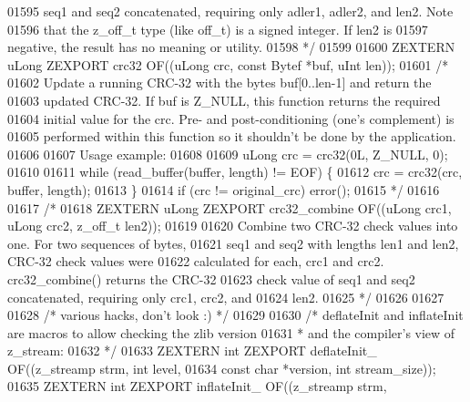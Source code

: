 \begin{DoxyCode}
01595 \textcolor{comment}{   seq1 and seq2 concatenated, requiring only adler1, adler2, and len2.  Note}
01596 \textcolor{comment}{   that the z\_off\_t type (like off\_t) is a signed integer.  If len2 is}
01597 \textcolor{comment}{   negative, the result has no meaning or utility.}
01598 \textcolor{comment}{*/}
01599 
01600 ZEXTERN uLong ZEXPORT crc32   OF((uLong crc, \textcolor{keyword}{const} Bytef *buf, uInt len));
01601 \textcolor{comment}{/*}
01602 \textcolor{comment}{     Update a running CRC-32 with the bytes buf[0..len-1] and return the}
01603 \textcolor{comment}{   updated CRC-32.  If buf is Z\_NULL, this function returns the required}
01604 \textcolor{comment}{   initial value for the crc.  Pre- and post-conditioning (one's complement) is}
01605 \textcolor{comment}{   performed within this function so it shouldn't be done by the application.}
01606 \textcolor{comment}{}
01607 \textcolor{comment}{   Usage example:}
01608 \textcolor{comment}{}
01609 \textcolor{comment}{     uLong crc = crc32(0L, Z\_NULL, 0);}
01610 \textcolor{comment}{}
01611 \textcolor{comment}{     while (read\_buffer(buffer, length) != EOF) \{}
01612 \textcolor{comment}{       crc = crc32(crc, buffer, length);}
01613 \textcolor{comment}{     \}}
01614 \textcolor{comment}{     if (crc != original\_crc) error();}
01615 \textcolor{comment}{*/}
01616 
01617 \textcolor{comment}{/*}
01618 \textcolor{comment}{ZEXTERN uLong ZEXPORT crc32\_combine OF((uLong crc1, uLong crc2, z\_off\_t len2));}
01619 \textcolor{comment}{}
01620 \textcolor{comment}{     Combine two CRC-32 check values into one.  For two sequences of bytes,}
01621 \textcolor{comment}{   seq1 and seq2 with lengths len1 and len2, CRC-32 check values were}
01622 \textcolor{comment}{   calculated for each, crc1 and crc2.  crc32\_combine() returns the CRC-32}
01623 \textcolor{comment}{   check value of seq1 and seq2 concatenated, requiring only crc1, crc2, and}
01624 \textcolor{comment}{   len2.}
01625 \textcolor{comment}{*/}
01626 
01627 
01628                         \textcolor{comment}{/* various hacks, don't look :) */}
01629 
01630 \textcolor{comment}{/* deflateInit and inflateInit are macros to allow checking the zlib version}
01631 \textcolor{comment}{ * and the compiler's view of z\_stream:}
01632 \textcolor{comment}{ */}
01633 ZEXTERN \textcolor{keywordtype}{int} ZEXPORT deflateInit\_ OF((z\_streamp strm, \textcolor{keywordtype}{int} level,
01634                                      \textcolor{keyword}{const} \textcolor{keywordtype}{char} *version, \textcolor{keywordtype}{int} stream\_size));
01635 ZEXTERN \textcolor{keywordtype}{int} ZEXPORT inflateInit\_ OF((z\_streamp strm,

\end{DoxyCode}
